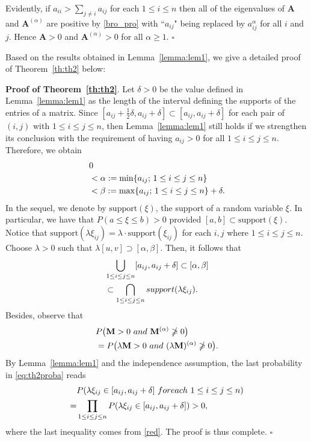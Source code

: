 \documentclass[conference,letterpaper]{IEEEtran}
\numberwithin{equation}{section}
\newcommand{\lbl}{\label}
\newcommand{\bea}{\begin{eqnarray}}
\newcommand{\eea}{\end{eqnarray}}
\begin{document}
Evidently, if $a_{ii}>  \sum_{j\ne i}a_{ij}$ for each $1\leq i\leq n$ then all of the eigenvalues of  $\mathbf{A}$  and $\mathbf{A}^{(\alpha)}$ are positive by \eqref{bro_pro} with ``$a_{ij}$" being replaced by $a_{ij}^{\alpha}$ for all $i$ and $j$. Hence $\mathbf{A} > 0$ and $\mathbf{A}^{(\alpha)}> 0$ for all $\alpha\geq 1.$ \hfill$\square$
\medskip


Based on the results obtained in Lemma~\ref{lemma:lem1}, we give a detailed proof of Theorem~\ref{th:th2} below:

\noindent\textbf{Proof of Theorem~\ref{th:th2}}. Let $\delta >0$ be the value defined in Lemma~\ref{lemma:lem1} as the length of the interval defining the supports of the entries of a matrix. 
Since $[a_{ij}+\frac{1}{2}\delta, a_{ij}+\delta] \subset [a_{ij}, a_{ij}+\delta]$  for each pair of $(i, j)$ with $1\leq i\leq j \leq n$, then Lemma~\ref{lemma:lem1} still holds if we strengthen its conclusion with the requirement of having $a_{ij}>0$ for all $1\leq i\leq j \leq n$.
Therefore, we obtain
\bea\lbl{poker}
&0\\\notag
&<\alpha:=\min\{a_{ij};\, 1\leq i\leq j \leq n\}\\\notag
& < \beta:=\max\{a_{ij};\, 1\leq i\leq j \leq n\}+\delta.\notag
\eea
In the sequel, we denote by $\mbox{support}(\xi)$, the support of a random variable $\xi$.
In particular, we have that $P(a\leq \xi\leq  b)>0$ provided $[a, b]\subset \mbox{support}(\xi)$.
Notice that $\mbox{support}(\lambda\xi_{ij})=\lambda\cdot \mbox{support}(\xi_{ij})$ for each $i, j$ where $1\leq i\leq j \leq n$. 
Choose $\lambda>0$ such that $\lambda [u, v]\supset [\alpha , \beta]$. 
Then, it follows that
\bea\lbl{red}
& \bigcup_{1\leq i\leq  j\leq n}[a_{ij}, a_{ij}+\delta] \subset [\alpha, \beta]\\\notag
& \subset \bigcap_{1\leq i\leq  j\leq n}  \mbox{support}(\lambda\xi_{ij}).\notag
\eea
Besides, observe that
\bea\label{eq:th2proba}
& P\big(\mathbf{M}>0\ \mbox{and}\ \mathbf{M}^{(\alpha)}\ngeqslant 0\big)\\\notag
& = P\big(\lambda\mathbf{M}>0\ \mbox{and}\ (\lambda\mathbf{M})^{(\alpha)}\ngeqslant 0\big).\notag
\eea
By Lemma~\ref{lemma:lem1} and the independence assumption, the last probability in \eqref{eq:th2proba} reads
\begin{align}\notag
& P(\lambda \xi_{ij}\in [a_{ij}, a_{ij}+\delta]\ \mbox{for each}\ 1\leq i\leq j \leq n)\\\notag
=& \prod_{1\leq i\leq j \leq n}P(\lambda\xi_{ij}\in [a_{ij}, a_{ij}+\delta])>0,\notag
\end{align}
where the last inequality comes from \eqref{red}. 
The proof is thus complete. \hfill$\square$
\end{document}
